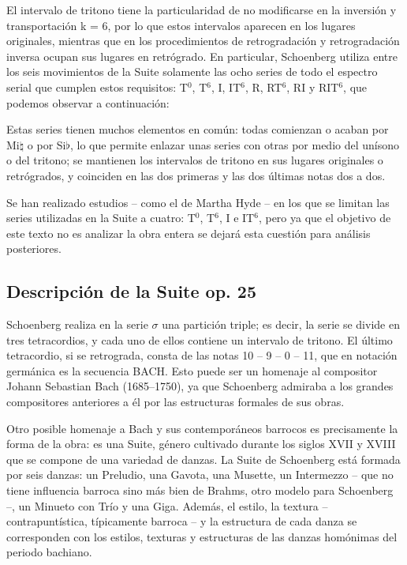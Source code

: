 		El intervalo de tritono tiene la particularidad de no modificarse en la inversión y transportación k = 6, por lo que estos intervalos aparecen en los lugares originales, mientras que en los procedimientos de retrogradación y retrogradación inversa ocupan sus lugares en retrógrado. En particular, Schoenberg utiliza entre los seis movimientos de la Suite solamente las ocho series de todo el espectro serial que cumplen estos requisitos: T$^0$, T$^6$, I, IT$^6$, R, RT$^6$, RI y RIT$^6$, que podemos observar %
		a continuación:
		
		
		
		Estas series tienen muchos elementos en común: todas comienzan o acaban por Mi$\natural$ o por Si$\flat$, lo que permite enlazar unas series con otras por medio del unísono o del tritono; se mantienen los intervalos de tritono en sus lugares originales o retrógrados, y coinciden en las dos primeras y las dos últimas notas dos a dos.
		
		Se han realizado estudios -- como el de Martha Hyde \cite{hyde} -- en los que se limitan las series utilizadas en la Suite a cuatro: T$^0$, T$^6$, I e IT$^6$, pero ya que el objetivo de este texto no es analizar la obra entera se dejará esta cuestión para análisis posteriores.
		
	\subsection{Descripción de la Suite op. 25}
		Schoenberg realiza en la serie $\sigma$ una partición triple; es decir, la serie se divide en tres tetracordios, y cada uno de ellos contiene un intervalo de tritono. El último tetracordio, si se retrograda, consta de las notas 10 -- 9 -- 0 -- 11, que en notación germánica es la secuencia BACH. Esto puede ser un homenaje al compositor Johann Sebastian Bach (1685--1750), ya que Schoenberg admiraba a los grandes compositores anteriores a él por las estructuras formales de sus obras.
		\cite{xiao}
		
		Otro posible homenaje a Bach y sus contemporáneos barrocos es precisamente la forma de la obra: es una Suite, género cultivado durante los siglos XVII y XVIII que se compone de una variedad de danzas. La Suite de Schoenberg está formada por seis danzas: un Preludio, una Gavota, una Musette, un Intermezzo -- que no tiene influencia barroca sino más bien de Brahms, otro modelo para Schoenberg --, un Minueto con Trío y una Giga. Además, el estilo, la textura -- contrapuntística, típicamente barroca -- y la estructura de cada danza se corresponden con los estilos, texturas y estructuras de las danzas homónimas del periodo bachiano.
        
